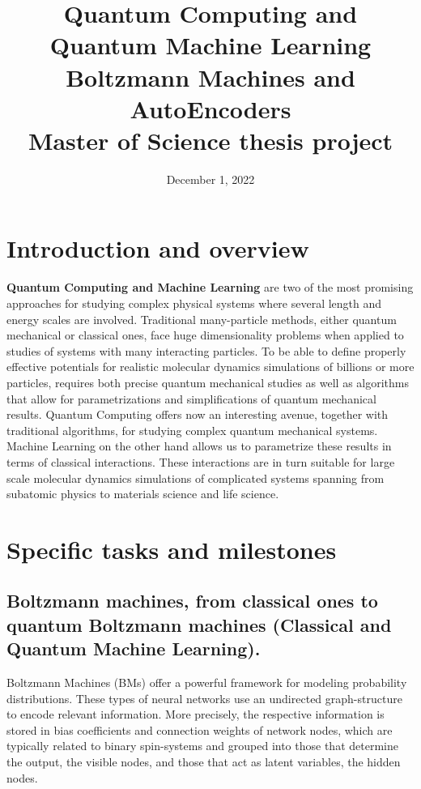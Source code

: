 \documentclass{article}
\title{Quantum Computing and Quantum Machine Learning \\ \vspace{5px} Boltzmann Machines and AutoEncoders \large \\ \vspace{20px} \large Master of Science thesis project}
\date{December 1,  2022}
\begin{document}
\maketitle

\section*{Introduction and overview}

\textbf{Quantum Computing and Machine Learning} are two of the most promising
approaches for studying complex physical systems where several length
and energy scales are involved.  Traditional many-particle methods,
either quantum mechanical or classical ones, face huge dimensionality
problems when applied to studies of systems with many interacting
particles. To be able to define properly effective potentials for
realistic molecular dynamics simulations of billions or more
particles, requires both precise quantum mechanical studies as well as
algorithms that allow for parametrizations and simplifications of
quantum mechanical results. Quantum Computing offers now an
interesting avenue, together with traditional algorithms, for studying
complex quantum mechanical systems. Machine Learning on the other hand
allows us to parametrize these results in terms of classical
interactions. These interactions are in turn suitable for large scale
molecular dynamics simulations of complicated systems spanning from
subatomic physics to materials science and life science.

\section*{Specific tasks and milestones}

\subsection*{Boltzmann machines, from classical ones to quantum Boltzmann machines (Classical and Quantum Machine Learning).}

Boltzmann Machines (BMs) offer a powerful framework for modeling
probability distributions.  These types of neural networks use an
undirected graph-structure to encode relevant information.  More
precisely, the respective information is stored in bias coefficients
and connection weights of network nodes, which are typically related
to binary spin-systems and grouped into those that determine the
output, the visible nodes, and those that act as latent variables, the
hidden nodes.
\end{document}
